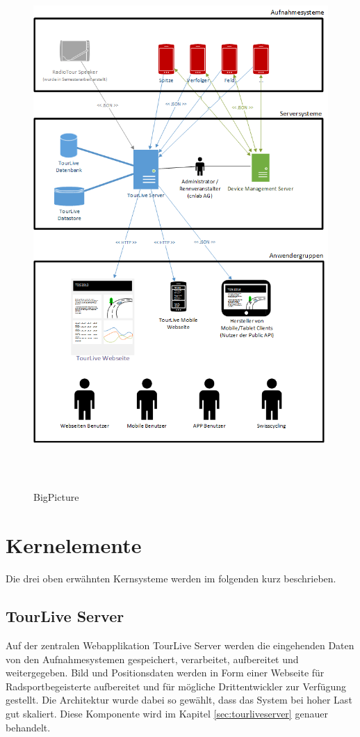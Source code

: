 \begin{figure}[H]
	\centering
	\includegraphics[height=200mm]{images/BigPicture.png}
	\caption{BigPicture}
	\label{fig:bigpicture}
\end{figure}

\pagebreak

\section{Kernelemente}
Die drei oben erwähnten Kernsysteme werden im folgenden kurz beschrieben.

\subsection{TourLive Server}
Auf der zentralen Webapplikation TourLive Server werden die eingehenden Daten von den Aufnahmesystemen gespeichert, verarbeitet, aufbereitet und weitergegeben. Bild und Positionsdaten werden in Form einer Webseite für Radsportbegeisterte aufbereitet und für mögliche Drittentwickler zur Verfügung gestellt. Die Architektur wurde dabei so gewählt, dass das System bei hoher Last gut skaliert. Diese Komponente wird im Kapitel \ref{sec:tourliveserver} genauer behandelt.

